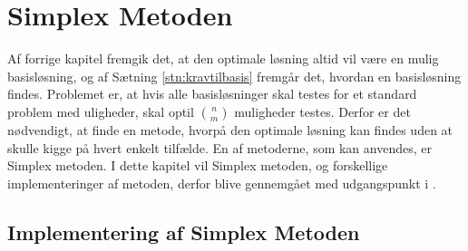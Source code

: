 \chapter{Simplex Metoden}
Af forrige kapitel fremgik det, at den optimale løsning altid vil være en mulig basisløsning, og af Sætning \ref{stn:kravtilbasis}
fremgår det, hvordan en basisløsning findes. 
Problemet er, at hvis alle basisløsninger skal testes for et standard problem med uligheder, skal optil $\binom{n}{m}$ muligheder testes. 
Derfor er det nødvendigt, at finde en metode, hvorpå den optimale løsning kan findes uden at skulle kigge på hvert enkelt tilfælde. 
En af metoderne, som kan anvendes, er Simplex metoden. I dette kapitel vil Simplex metoden, og forskellige implementeringer af metoden, derfor blive gennemgået med udgangspunkt i .



\section{Implementering af Simplex Metoden}



